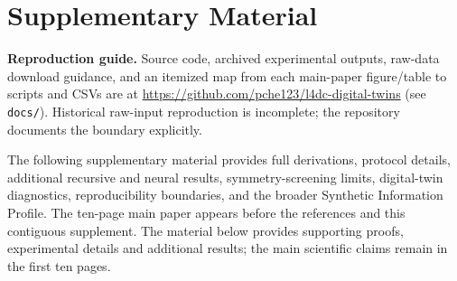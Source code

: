 \documentclass{l4dc2027}
\begin{document}


\clearpage
\appendix
\makeatletter{}\makeatother
\renewcommand{\theHfigure}{S\arabic{figure}}\renewcommand{\theHtable}{S\arabic{table}}\renewcommand{\theHequation}{S\arabic{equation}}
\section*{Supplementary Material}
\noindent\textbf{Reproduction guide.} Source code, archived experimental outputs, raw-data download guidance, and an itemized map from each main-paper figure/table to scripts and CSVs are at \url{https://github.com/pche123/l4dc-digital-twins} (see \texttt{docs/}). Historical raw-input reproduction is incomplete; the repository documents the boundary explicitly.\par\medskip
\noindent
The following supplementary material provides full derivations, protocol details,
additional recursive and neural results, symmetry-screening limits, digital-twin
diagnostics, reproducibility boundaries, and the broader Synthetic Information
Profile. The ten-page main paper appears before the references and this
contiguous supplement. The material below provides supporting proofs, experimental
details and additional results; the main scientific claims remain in the first ten pages.


\end{document}
